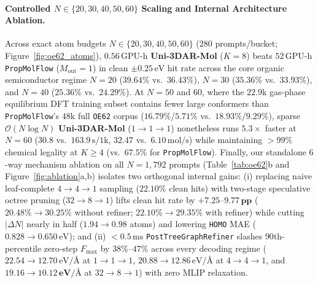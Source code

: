 \documentclass[11pt,a4paper]{article}
\begin{document}
\paragraph{Controlled $N \in \{20, 30, 40, 50, 60\}$ Scaling and Internal Architecture Ablation.}
Across exact atom budgets $N \in \{20, 30, 40, 50, 60\}$ ($280$ prompts/bucket; Figure~\ref{fig:oe62_atoms}), $0.56\,\text{GPU-h}$ \textbf{Uni-3DAR-Mol} ($K=8$) beats $52\,\text{GPU-h}$ \texttt{PropMolFlow} ($M_{\text{out}}=1$) in clean $\pm 0.25\,\text{eV}$ hit rate across the core organic semiconductor regime $N=20$ ($\mathbf{39.64\%}$ vs.\ $36.43\%$), $N=30$ ($\mathbf{35.36\%}$ vs.\ $33.93\%$), and $N=40$ ($\mathbf{25.36\%}$ vs.\ $24.29\%$). At $N=50$ and $60$, where the $22.9\text{k}$ gas-phase equilibrium DFT training subset contains fewer large conformers than \texttt{PropMolFlow}'s $48\text{k}$ full \texttt{OE62} corpus ($16.79\% / 5.71\%$ vs.\ $18.93\% / 9.29\%$), sparse $\mathcal{O}(N \log N)$ \textbf{Uni-3DAR-Mol} ($1\to 1\to 1$) nonetheless runs $\mathbf{5.3\times}$ faster at $N=60$ ($30.8$ vs.\ $163.9\,\text{s/1k}$, $32.47$ vs.\ $6.10\,\text{mol/s}$) while maintaining $>99\%$ chemical legality at $K \ge 4$ (vs.\ $67.5\%$ for \texttt{PropMolFlow}). Finally, our standalone $6$-way mechanism ablation on all $N=1{,}792$ prompts (Table~\ref{tab:oe62}b and Figure~\ref{fig:ablation}a,b) isolates two orthogonal internal gains: (i) replacing naive leaf-complete $4\to 4\to 1$ sampling ($22.10\%$ clean hits) with two-stage speculative octree pruning ($32\to 8\to 1$) lifts clean hit rate by $\mathbf{+7.25\text{--}9.77\,\text{pp}}$ ($20.48\% \to 30.25\%$ without refiner; $22.10\% \to \mathbf{29.35\%}$ with refiner) while cutting $|\Delta N|$ nearly in half ($1.94 \to \mathbf{0.98}$ atoms) and lowering \texttt{HOMO} MAE ($0.828 \to \mathbf{0.650}\,\text{eV}$); and (ii) $<0.5\,\text{ms}$ \texttt{PostTree\allowbreak Graph\allowbreak Refiner} slashes $90$th-percentile zero-step $F_{\max}$ by $38\%\text{--}47\%$ across every decoding regime ($22.54 \to 12.70\,\text{eV/\AA}$ at $1\to 1\to 1$, $20.88 \to 12.86\,\text{eV/\AA}$ at $4\to 4\to 1$, and $19.16 \to \mathbf{10.12\,\text{eV/\AA}}$ at $32\to 8\to 1$) with zero MLIP relaxation.
\end{document}
